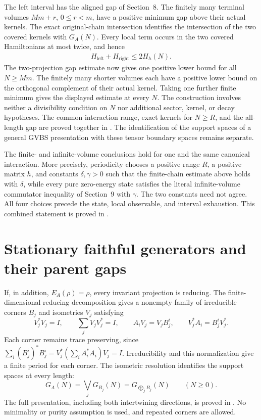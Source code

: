 \documentclass{article}
\begin{document}
The left interval has the aligned gap of Section~8. The finitely many
terminal volumes $Mm+r$, $0\leq r<m$, have a positive minimum gap above
their actual kernels. The exact original-chain intersection identifies
the intersection of the two covered kernels with $G_A(N)$. Every local
term occurs in the two covered Hamiltonians at most twice, and hence
\begin{align}
  H_{\mathrm{left}}+H_{\mathrm{right}}\leq2H_h(N).
\end{align}
The two-projection gap estimate now gives one positive lower bound for
all $N\geq Mm$. The finitely many shorter volumes each have a positive
lower bound on the orthogonal complement of their actual kernel. Taking
one further finite minimum gives the displayed estimate at every $N$.
The construction involves neither a divisibility
condition on $N$ nor additional sector, kernel, or decay hypotheses.
The common interaction range, exact kernels for $N\geq R$, and the
all-length gap are proved together in
.
The identification of the support spaces of a general GVBS presentation
with these tensor boundary spaces remains separate.

The finite- and infinite-volume conclusions hold for one and the same
canonical interaction. More precisely, periodicity chooses a positive range
$R$, a positive matrix $h$, and constants $\delta,\gamma>0$ such that the
finite-chain estimate above holds with $\delta$, while every pure zero-energy
state satisfies the literal infinite-volume commutator inequality of
Section~9 with $\gamma$. The two constants need not agree. All four choices
precede the state, local observable, and interval exhaustion. This combined
statement is proved in
.

\section{Stationary faithful generators and their parent gaps}

If, in addition, $E_A(\rho)=\rho$, every invariant projection is reducing.
The finite-dimensional reducing decomposition gives a nonempty family of
irreducible corners $B_j$ and isometries $V_j$ satisfying
\[
 V_j^*V_j=I,\qquad \sum_jV_jV_j^*=I,\qquad
 A_iV_j=V_jB_j^i,\qquad V_j^*A_i=B_j^iV_j^*.
\]
Each corner remains trace preserving, since
$\sum_i(B_j^i)^*B_j^i=V_j^*(\sum_iA_i^*A_i)V_j=I$.
Irreducibility and this normalization give a finite period for each corner.
The isometric resolution identifies the support spaces at every length:
\[
 G_A(N)=\bigvee_jG_{B_j}(N)=G_{\bigoplus_jB_j}(N)
 \qquad(N\geq0).
\]
The full presentation, including both intertwining directions, is proved in
.
No minimality or purity assumption is used, and repeated corners are allowed.
\end{document}
